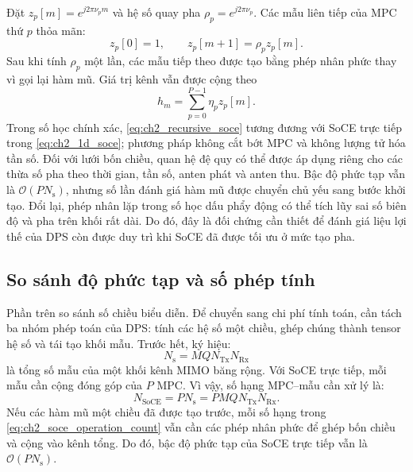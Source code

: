 Đặt \(z_p[m]=e^{j2\pi\nu_p m}\) và hệ số quay pha \(\rho_p=e^{j2\pi\nu_p}\). Các mẫu liên tiếp của MPC thứ \(p\) thỏa mãn:
\begin{equation}
z_p[0]=1,
\qquad
z_p[m+1]=\rho_p z_p[m].
\label{eq:ch2_recursive_phasor}
\end{equation}
Sau khi tính \(\rho_p\) một lần, các mẫu tiếp theo được tạo bằng phép nhân phức thay vì gọi lại hàm mũ. Giá trị kênh vẫn được cộng theo
\begin{equation}
h_m=\sum_{p=0}^{P-1}\eta_p z_p[m].
\label{eq:ch2_recursive_soce}
\end{equation}
Trong số học chính xác, \eqref{eq:ch2_recursive_soce} tương đương với SoCE trực tiếp trong \eqref{eq:ch2_1d_soce}; phương pháp không cắt bớt MPC và không lượng tử hóa tần số. Đối với lưới bốn chiều, quan hệ đệ quy có thể được áp dụng riêng cho các thừa số pha theo thời gian, tần số, anten phát và anten thu. Bậc độ phức tạp vẫn là \(\mathcal{O}(PN_{\mathrm{s}})\), nhưng số lần đánh giá hàm mũ được chuyển chủ yếu sang bước khởi tạo. Đổi lại, phép nhân lặp trong số học dấu phẩy động có thể tích lũy sai số biên độ và pha trên khối rất dài. Do đó, đây là đối chứng cần thiết để đánh giá liệu lợi thế của DPS còn được duy trì khi SoCE đã được tối ưu ở mức tạo pha.

\subsection{So sánh độ phức tạp và số phép tính}
\label{subsec:ch2_operation_count}

Phần trên so sánh số chiều biểu diễn. Để chuyển sang chi phí tính toán, cần tách ba nhóm phép toán của DPS: tính các hệ số một chiều, ghép chúng thành tensor hệ số và tái tạo khối mẫu. Trước hết, ký hiệu:
\begin{equation}
N_{\mathrm{s}}
=MQN_{\mathrm{Tx}}N_{\mathrm{Rx}}
\label{eq:ch2_total_samples}
\end{equation}
là tổng số mẫu của một khối kênh MIMO băng rộng. Với SoCE trực tiếp, mỗi mẫu cần cộng đóng góp của \(P\) MPC. Vì vậy, số hạng MPC--mẫu cần xử lý là:
\begin{equation}
N_{\mathrm{SoCE}}
=PN_{\mathrm{s}}
=PMQN_{\mathrm{Tx}}N_{\mathrm{Rx}}.
\label{eq:ch2_soce_operation_count}
\end{equation}
Nếu các hàm mũ một chiều đã được tạo trước, mỗi số hạng trong \eqref{eq:ch2_soce_operation_count} vẫn cần các phép nhân phức để ghép bốn chiều và cộng vào kênh tổng. Do đó, bậc độ phức tạp của SoCE trực tiếp vẫn là \(\mathcal{O}(PN_{\mathrm{s}})\).

